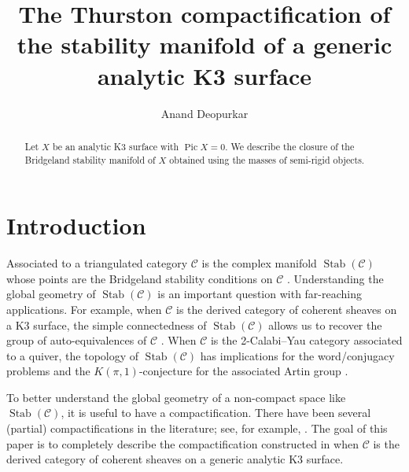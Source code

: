 \documentclass{amsart}
\title[Compactified stability manifold of a generic K3]{The Thurston compactification of the stability manifold of a generic analytic K3 surface}
\author{Anand Deopurkar}
\begin{document}
\begin{abstract}
  Let \(X\) be an analytic K3 surface with \(\operatorname{Pic} X = 0\).
  We describe the closure of the Bridgeland stability manifold of \(X\) obtained using the masses of semi-rigid objects.
\end{abstract}

\maketitle
\section{Introduction}
Associated to a triangulated category \(\mathcal{C}\) is the complex manifold \(\operatorname{Stab}(\mathcal{C})\) whose points are the Bridgeland stability conditions on \(\mathcal{C}\) \cite{bri:07}.
Understanding the global geometry of \(\operatorname{Stab}(\mathcal{C})\) is an important question with far-reaching applications.
For example, when \(\mathcal{C}\) is the derived category of coherent sheaves on a K3 surface, the simple connectedness of \(\operatorname{Stab}(\mathcal{C})\) allows us to recover the group of auto-equivalences of \(\mathcal{C}\) \cite{bay.bri:17}.
When \(\mathcal{C}\) is the 2-Calabi--Yau category associated to a quiver, the topology of \(\operatorname{Stab}(\mathcal{C})\) has implications for the word/conjugacy problems and the \(K(\pi,1)\)-conjecture  for the associated Artin group \cite{qiu.woo:18,hen.lic:24}.

To better understand the global geometry of a non-compact space like \(\operatorname{Stab}(\mathcal{C})\), it is useful to have a compactification.
There have been several (partial) compactifications in the literature; see, for example, \cite{bro.pau.plo.ea:22,bar.mol.so:23,bol:23,bap.deo.lic:20}.
The goal of this paper is to completely describe the compactification constructed in \cite{bap.deo.lic:20} when \(\mathcal{C}\) is the derived category of coherent sheaves on a generic analytic K3 surface.
\end{document}
